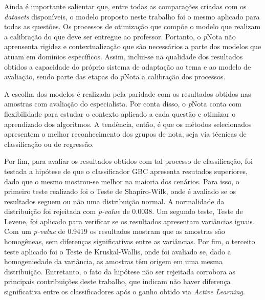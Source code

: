 Ainda é importante salientar que, entre todas as comparações criadas com os \textit{datasets} disponíveis, o modelo proposto neste trabalho foi o mesmo aplicado para todas as questões. Os processos de otimização que compõe o modelo que realizam a calibração do que deve ser entregue ao professor. Portanto, o \textit{p}Nota não aprensenta rigidez e contextualização que são necessários a parte dos modelos que atuam em domínios específicos. Assim, inclui-se na qualidade dos resultados obtidos a capacidade do próprio sistema de adaptação ao tema e ao modelo de avaliação, sendo parte das etapas do \textit{p}Nota a calibração dos processos.

A escolha dos modelos é realizada pela paridade com os resultados obtidos nas amostras com avaliação do especialista. Por conta disso, o \textit{p}Nota conta com flexibilidade para estudar o contexto aplicado a cada questão e otimizar o aprendizado dos algoritmos. A tendência, então, é que os métodos selecionados apresentem o melhor reconhecimento dos grupos de nota, seja via técnicas de classificação ou de regressão.

Por fim, para avaliar os resultados obtidos com tal processo de classificação, foi testada a hipótese de que o classificador GBC apresenta resutados superiores, dado que o mesmo mostrou-se melhor na maioria dos cenários. Para isso, o primeiro teste realizado foi o Teste de Shapiro-Wilk, onde é avaliado se os resultados seguem ou não uma distribuição normal. A normalidade da distribuição foi rejeitada com \textit{p-value} de 0.0038. Um segundo teste, Teste de Levene, foi aplicado para verificar se os resultados apresentam variâncias iguais. Com um \textit{p-value} de 0.9419 os resultados mostram que as amostras são homogêneas, sem diferenças significativas entre as variâncias. Por fim, o terceito teste aplicado foi o Teste de Kruskal-Wallis, onde foi avaliado se, dado a homogeniedade da variância, as amostras têm origem em uma mesma distribuição. Entretanto, o fato da hipótese não ser rejeitada corrobora as principais contribuições deste trabalho, que indicam não haver diferença significativa entre os classificadores após o ganho obtido via \textit{Active Learning}.